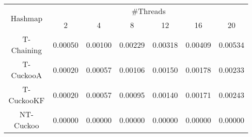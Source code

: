 \begin{tabular}{|c|c|c|c|c|c|c|}
\hline
\multirow{2}{*}{Hashmap} & \multicolumn{6}{c|}{\#Threads}\\\cline{2-7}& 2 & 4 & 8 & 12 & 16 & 20\\
\hline
\hline
T-Chaining & 0.00050 & 0.00100 & 0.00229 & 0.00318 & 0.00409 & 0.00534\\
T-CuckooA & 0.00020 & 0.00057 & 0.00106 & 0.00150 & 0.00178 & 0.00233\\
T-CuckooKF & 0.00020 & 0.00057 & 0.00095 & 0.00140 & 0.00171 & 0.00243\\
NT-Cuckoo & 0.00000 & 0.00000 & 0.00000 & 0.00000 & 0.00000 & 0.00000\\
\hline
\end{tabular}

